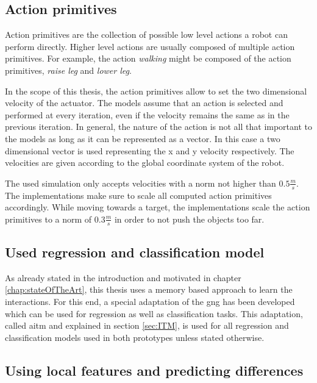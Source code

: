\subsection{Action primitives}

Action primitives are the collection of possible low level actions a robot can perform directly. Higher level actions are usually composed of multiple action primitives. For example, the action \textit{walking} might be composed of the action primitives, \textit{raise leg} and \textit{lower leg}.

In the scope of this thesis, the action primitives allow to set the two dimensional velocity of the actuator. 
The models assume that an action is selected and performed at every iteration, even if the velocity remains the same as in the previous iteration.
In general, the nature of the action is not all that important to the models as long as it can be represented as a vector. In this case a two dimensional vector is used representing the x and y velocity respectively. The velocities are given according to the global coordinate system of the robot. 

The used simulation only accepts velocities with a norm not higher than $0.5\frac{m}{s}$. The implementations make sure to scale all computed action primitives accordingly. While moving towards a target, the implementations scale the action primitives to a norm of $0.3\frac{m}{s}$ in order to not push the objects too far.

\subsection{Used regression and classification model}

As already stated in the introduction and motivated in chapter \ref{chap:stateOfTheArt}, this thesis uses a memory based approach to learn the interactions. For this end, a special adaptation of the \gls{gng} has been developed which can be used for regression as well as classification tasks. This adaptation, called \acrfull{aitm} and explained in section \ref{sec:ITM}, is used for all regression and classification models used in both prototypes unless stated otherwise. 

\subsection{Using local features and predicting differences \label{sec:localFeatures}}

